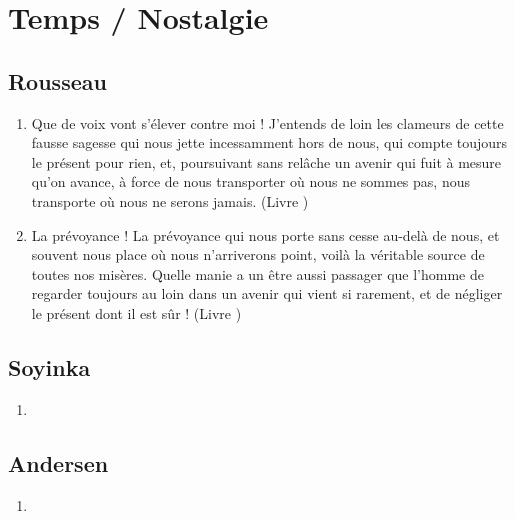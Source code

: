 \documentclass[a4paper, 11pt, hidelinks]{article}
\newcommand{\rb}[1]{\Romanbar{#1}}
\begin{document}
\section{Temps / Nostalgie}



\subsection{Rousseau}


\begin{enumerate}
    \item Que de voix vont s'élever contre moi ! J'entends de loin les clameurs de cette fausse sagesse qui nous jette incessamment hors de nous, qui compte toujours le présent pour rien, et, poursuivant sans relâche un avenir qui fuit à mesure qu'on avance, à force de nous transporter où nous ne sommes pas, nous transporte où nous ne serons jamais. (Livre \rb{2})
    \item La prévoyance ! La prévoyance qui nous porte sans cesse au-delà de nous, et souvent nous place où nous n'arriverons point, voilà la véritable source de toutes nos misères. Quelle manie a un être aussi passager que l'homme de regarder toujours au loin dans un avenir qui vient si rarement, et de négliger le présent dont il est sûr ! (Livre \rb{2})
\end{enumerate}



\subsection{Soyinka}


\begin{enumerate}
    \item 
\end{enumerate}




\subsection{Andersen}


\begin{enumerate}
    \item 
\end{enumerate}
\end{document}
